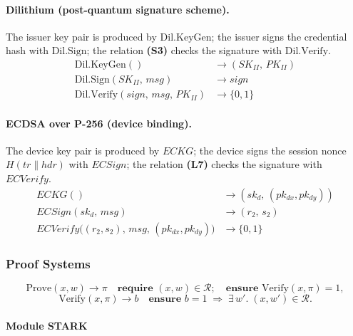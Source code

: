 \documentclass{article}
\newcommand{\concat}{\mathbin{\|}}
\newcommand{\DilKG}{\mathrm{Dil.KeyGen}}
\newcommand{\DilSign}{\mathrm{Dil.Sign}}
\newcommand{\DilVerify}{\mathrm{Dil.Verify}}
\begin{document}
\paragraph{Dilithium (post-quantum signature scheme).}
The issuer key pair is produced by $\DilKG$; the issuer signs the credential
hash with $\DilSign$; the relation \textbf{(S3)} checks the signature with
$\DilVerify$.
\begin{align*}
\DilKG()                         &\to (SK_{II},\, PK_{II}) \\
\DilSign(SK_{II},\, msg)         &\to sign \\
\DilVerify(sign,\, msg,\, PK_{II}) &\to \{0,1\}
\end{align*}

\paragraph{ECDSA over P-256 (device binding).}
The device key pair is produced by $ECKG$; the device signs the session
nonce $H(tr \concat hdr)$ with $ECSign$; the relation \textbf{(L7)} checks the
signature with $ECVerify$.
\begin{align*}
ECKG()                                                       &\to (sk_d,\, (pk_{dx}, pk_{dy})) \\
ECSign(sk_d,\, msg)                                          &\to (r_2,\, s_2) \\
ECVerify\!\bigl((r_2, s_2),\, msg,\, (pk_{dx}, pk_{dy})\bigr) &\to \{0,1\}
\end{align*}

\subsubsection{Proof Systems}
\label{sec:proof-systems}

\[
  \mathrm{Prove}(x, w) \to \pi
  \quad\textbf{require } (x,w)\in\mathcal{R};\quad
  \textbf{ensure } \mathrm{Verify}(x,\pi)=1,
\]
\[
  \mathrm{Verify}(x, \pi) \to b
  \quad\textbf{ensure } b=1 \;\Rightarrow\; \exists\, w'.\; (x,w')\in\mathcal{R}.
\]

\paragraph{Module \textsf{STARK}}
\label{sec:stark}
\end{document}
